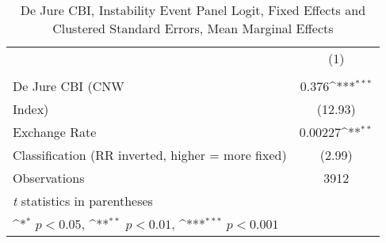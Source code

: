 \begin{table}[htbp]\centering
\def\sym#1{\ifmmode^{#1}\else\(^{#1}\)\fi}
\caption{De Jure CBI, Instability Event Panel Logit, Fixed Effects and Clustered Standard Errors, Mean Marginal Effects \label{margsJustBinInstabEventDJ}}
\begin{tabular}{l*{1}{c}}
\hline\hline
                    &\multicolumn{1}{c}{(1)}\\
                    &\multicolumn{1}{c}{} \\
\hline
De Jure CBI (CNW    &       0.376\sym{***}\\
Index)              &     (12.93)         \\
[1em]
Exchange Rate       &     0.00227\sym{**} \\
Classification (RR inverted, higher = more fixed)&      (2.99)         \\
\hline
Observations        &        3912         \\
\hline\hline
\multicolumn{2}{l}{\footnotesize \textit{t} statistics in parentheses}\\
\multicolumn{2}{l}{\footnotesize \sym{*} \(p<0.05\), \sym{**} \(p<0.01\), \sym{***} \(p<0.001\)}\\
\end{tabular}
\end{table}
